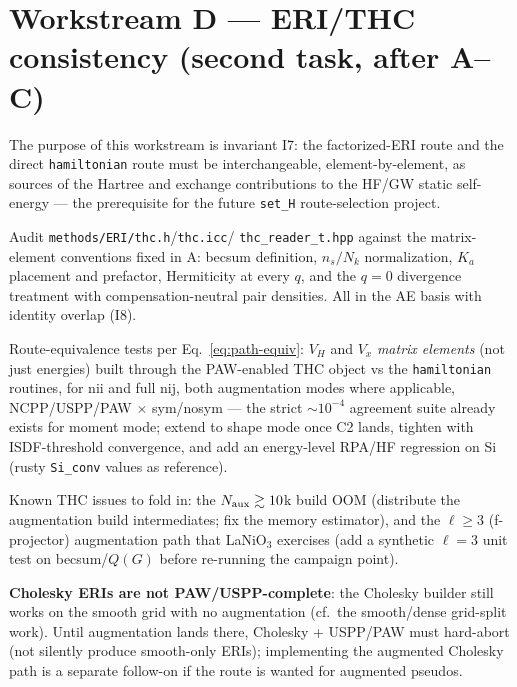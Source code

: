 \documentclass[11pt]{article}
\newcommand{\code}[1]{\texttt{\small #1}}
\newcommand{\file}[1]{\texttt{\small #1}}
\begin{document}
\section{Workstream D --- ERI/THC consistency (second task, after A--C)}
\label{sec:wsD}

The purpose of this workstream is invariant I7: the factorized-ERI route
and the direct \code{hamiltonian} route must be interchangeable,
element-by-element, as sources of the Hartree and exchange contributions to
the HF/GW static self-energy --- the prerequisite for the future
\code{set\_H} route-selection project.

\begin{description}[leftmargin=2.6em,style=nextline]
\item[D1.] Audit \file{methods/ERI/thc.h}/\file{thc.icc}/%
\file{thc\_reader\_t.hpp} against the matrix-element conventions fixed in
A: becsum definition, $n_s/N_k$ normalization, $K_a$ placement and
prefactor, Hermiticity at every $q$, and the $q{=}0$ divergence treatment
with compensation-neutral pair densities. All in the AE basis with
identity overlap (I8).

\item[D2.] Route-equivalence tests per Eq.~\eqref{eq:path-equiv}: $V_H$
and $V_x$ \emph{matrix elements} (not just energies) built through the
PAW-enabled THC object vs the \code{hamiltonian} routines, for nii and
full nij, both augmentation modes where applicable, NCPP/USPP/PAW
$\times$ sym/nosym --- the strict ${\sim}10^{-4}$ agreement suite already
exists for moment mode; extend to shape mode once C2 lands, tighten with
ISDF-threshold convergence, and add an energy-level RPA/HF regression on
Si (rusty \code{Si\_conv} values as reference).

\item[D3.] Known THC issues to fold in: the $N_{\rm aux} \gtrsim 10$k build
OOM (distribute the augmentation build intermediates; fix the memory
estimator), and the $\ell \ge 3$ (f-projector) augmentation path that
LaNiO$_3$ exercises (add a synthetic $\ell{=}3$ unit test on
becsum/$Q(G)$ before re-running the campaign point).

\item[D4.] \textbf{Cholesky ERIs are not PAW/USPP-complete}: the Cholesky
builder still works on the smooth grid with no augmentation (cf.\ the
smooth/dense grid-split work). Until augmentation lands there, Cholesky +
USPP/PAW must hard-abort (not silently produce smooth-only ERIs);
implementing the augmented Cholesky path is a separate follow-on if the
route is wanted for augmented pseudos.
\end{description}
\end{document}
